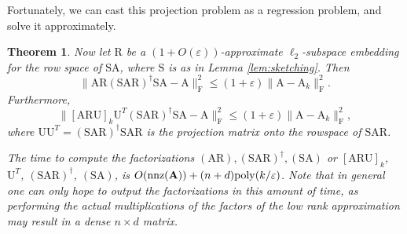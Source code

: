 \documentclass[11pt]{article}
\newcommand{\FNormS}[1]{\mbox{}\|#1\|_\mathrm{F}^2}
\newtheorem{theorem}{Theorem}
\newcommand{\mat}[1]{{\ensuremath{\bm{\mathrm{#1}}}}}
\def\matA{\mat{A}}
\def\matR{\mat{R}}
\def\matS{\mat{S}}
\def\matU{\mat{U}}
\def\nnz{{ \rm nnz }}
\newcommand{\eps}{\varepsilon}
\newcommand{\poly}{{\mathrm{poly}}}
\begin{document}
Fortunately, we can cast this projection problem as a regression problem, and solve it approximately. 
\begin{theorem}\label{thm:lowrank}
Now let $\matR$ be a $(1+O(\eps))$-approximate $\ell_2$-subspace embedding for the row space of $\matS\matA$, where $\matS$
is as in Lemma \ref{lem:sketching}. Then $$\FNormS{\matA\matR(\matS\matA\matR)^{\dagger}\matS\matA-\matA} \leq (1+\eps) \FNormS{\matA-\matA_k}.$$ Furthermore, 
$$\FNormS{[\matA\matR\matU]_k \matU^T (\matS \matA \matR)^{\dagger}\matS \matA -\matA} \leq (1+\eps)\FNormS{\matA-\matA_k},$$ 
where $\matU \matU^T = (\matS \matA \matR)^{\dagger} \matS \matA \matR$ is the projection
matrix onto the rowspace of $\matS \matA \matR$. 

The time to compute the factorizations 
$(\matA \matR), (\matS\matA\matR)^{\dagger}, (\matS \matA)$ or 
$[\matA \matR \matU]_k$, $\matU^T$, $(\matS \matA \matR)^{\dagger}$, 
$(\matS \matA)$,
is $O(\nnz(\matA)) + (n+d)\poly(k/\eps)$. Note that in general one can only hope to output
the factorizations in this amount of time, as performing the actual multiplications of the 
factors of the low rank approximation may result in a dense
$n \times d$ matrix. 
\end{theorem}
\end{document}
